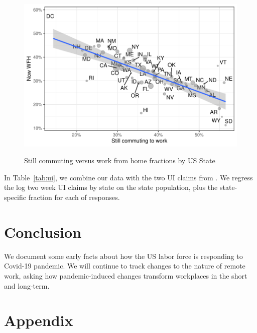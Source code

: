 \documentclass[12pt]{article}
\begin{document}
\begin{figure}
  \caption{Still commuting versus work from home fractions by US State} \label{fig:commute_vs_wfh}
\centering
\begin{minipage}{1.0 \linewidth}
  \includegraphics[width = \linewidth]{plots/commute_vs_wfh.pdf} \\
  \begin{footnotesize}
    \end{footnotesize}
\end{minipage}
\end{figure} 

In Table~\ref{tab:ui}, we combine our data with the two UI claims from \citep{goldsmith2020}.
We regress the log two week UI claims by state on the state population, plus the state-specific fraction for each of responses.  




\section{Conclusion}
We document some early facts about how the US labor force is responding to Covid-19 pandemic.
We will continue to track changes to the nature of remote work, asking how pandemic-induced changes transform workplaces in the short and long-term.
  
\newpage \clearpage




\appendix

\section{Appendix} 
\end{document}
